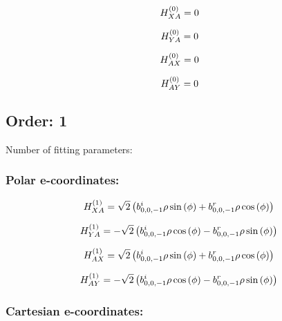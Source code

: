 \documentclass[fleqn]{article}
\begin{document}
\begin{dmath*}
H_{XA}^{(0)}=0\\
\end{dmath*}

\begin{dmath*}
H_{YA}^{(0)}=0\\
\end{dmath*}

\begin{dmath*}
H_{AX}^{(0)}=0\\
\end{dmath*}

\begin{dmath*}
H_{AY}^{(0)}=0\\
\end{dmath*}
\subsection{Order: 1}
Number of fitting parameters: 
\subsubsection*{Polar e-coordinates:}

\begin{dmath*}
H_{XA}^{(1)}=\sqrt{2} \left(b^{i}_{0,0,-1} \rho \sin{\left (\phi \right )} + b^{r}_{0,0,-1} \rho \cos{\left (\phi \right )}\right)\\
\end{dmath*}

\begin{dmath*}
H_{YA}^{(1)}=-  \sqrt{2} \left( b^{i}_{0,0,-1} \rho \cos{\left (\phi \right )} -  b^{r}_{0,0,-1} \rho \sin{\left (\phi \right )}\right)\\
\end{dmath*}

\begin{dmath*}
H_{AX}^{(1)}=\sqrt{2} \left(b^{i}_{0,0,-1} \rho \sin{\left (\phi \right )} + b^{r}_{0,0,-1} \rho \cos{\left (\phi \right )}\right)\\
\end{dmath*}

\begin{dmath*}
H_{AY}^{(1)}=-  \sqrt{2} \left( b^{i}_{0,0,-1} \rho \cos{\left (\phi \right )} -  b^{r}_{0,0,-1} \rho \sin{\left (\phi \right )}\right)\\
\end{dmath*}
\subsubsection*{Cartesian e-coordinates:}
\end{document}
